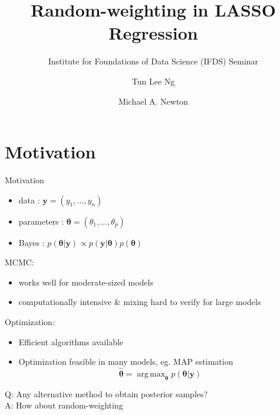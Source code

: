 \documentclass{beamer}
\title[Random-weighting]{Random-weighting in LASSO Regression} %
\subtitle{Institute for Foundations of Data Science (IFDS) Seminar}
\author{Tun Lee Ng \and Michael A. Newton}
\date{\displaydate{date}}
\DeclareMathOperator*{\argmax}{arg\,max}
\begin{document}
\begin{frame}
\titlepage
\end{frame}

\section{Motivation}

\begin{frame}{Motivation}
	\begin{itemize}
		\item data : $\bm{y} = (y_1, \ldots, y_n)$ 
		\item parameters : $\bm{\theta} = (\theta_1, \ldots, \theta_p)$ 
		\item Bayes : $p(\bm{\theta}|\bm{y}) \propto p(\bm{y}|\bm{\theta}) p(\bm{\theta})$
	\end{itemize}
	\vspace{0.3cm}
	MCMC:
	\begin{itemize}
		\item works well for moderate-sized models
		\item computationally intensive \& mixing hard to verify for large models 
	\end{itemize} 
	\vspace{0.3cm}
	Optimization:
	\begin{itemize}
		\item Efficient algorithms available 
		\item Optimization feasible in many models, eg. MAP estimation
		$$
		\widehat{\bm{\theta}} = \argmax_{\bm{\theta}} p(\bm{\theta}|\bm{y})
		$$ 
	\end{itemize}
	\vspace{0.3cm}
	Q: Any alternative method to obtain posterior samples?\\
	A: How about random-weighting \citep{WBB} \\
	\vspace{0.2cm}
\end{frame}
\end{document}
